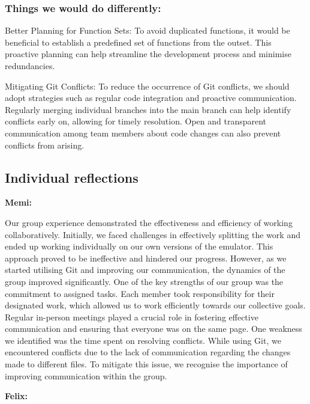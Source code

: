 \documentclass{article}
\begin{document}
\subsubsection{Things we would do differently:}

Better Planning for Function Sets: To avoid duplicated functions, it would be beneficial to establish a predefined set of functions from the outset. This proactive planning can help streamline the development process and minimise redundancies. 

Mitigating Git Conflicts: To reduce the occurrence of Git conflicts, we should adopt strategies such as regular code integration and proactive communication. Regularly merging individual branches into the main branch can help identify conflicts early on, allowing for timely resolution. Open and transparent communication among team members about code changes can also prevent conflicts from arising. 

\subsection{Individual reflections}

\textbf{Memi: }

Our group experience demonstrated the effectiveness and efficiency of working collaboratively. Initially, we faced challenges in effectively splitting the work and ended up working individually on our own versions of the emulator. This approach proved to be ineffective and hindered our progress. However, as we started utilising Git and improving our communication, the dynamics of the group improved significantly. One of the key strengths of our group was the commitment to assigned tasks. Each member took responsibility for their designated work, which allowed us to work efficiently towards our collective goals. Regular in-person meetings played a crucial role in fostering effective communication and ensuring that everyone was on the same page. One weakness we identified was the time spent on resolving conflicts. While using Git, we encountered conflicts due to the lack of communication regarding the changes made to different files. To mitigate this issue, we recognise the importance of improving communication within the group. 

\textbf{Felix:}
\end{document}
